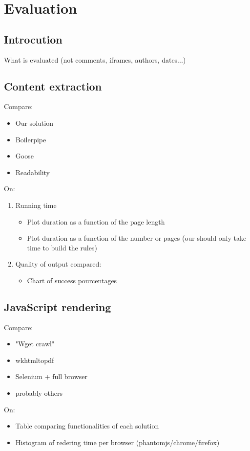 \section{Evaluation}

\subsection{Introcution}
What is evaluated (not comments, iframes, authors, dates...)

\subsection{Content extraction}
Compare:
\begin{itemize}
  \item Our solution
  \item Boilerpipe 
  \item Goose 
  \item Readability 
\end{itemize}
On:
\begin{enumerate}
  \item Running time
  \begin{itemize}
    \item Plot duration as a function of the page length
    \item Plot duration as a function of the number or pages (our should only take time to build the rules)
  \end{itemize}
  \item Quality of output compared:
  \begin{itemize}
    \item Chart of success pourcentages
  \end{itemize}
\end{enumerate}

\subsection{JavaScript rendering}
Compare:
\begin{itemize}
  \item "Wget crawl" 
  \item wkhtmltopdf 
  \item Selenium + full browser
  \item probably others
\end{itemize}
On:
\begin{itemize}
  \item Table comparing functionalities of each solution
  \item Histogram of redering time per browser (phantomjs/chrome/firefox)
\end{itemize}
